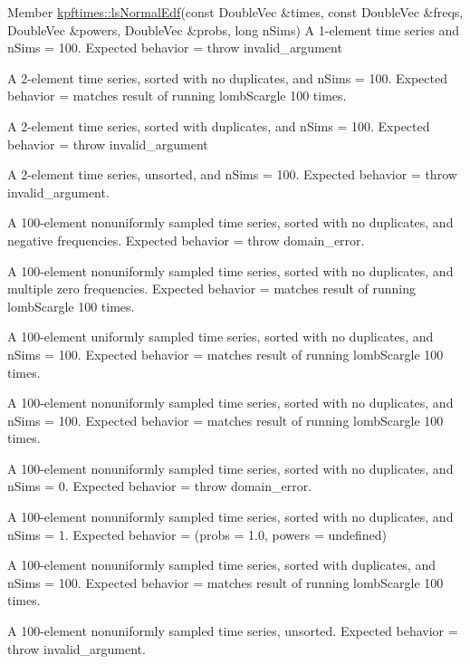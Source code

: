 \begin{DoxyDescription}
\item[Member \hyperlink{group__period_gab3a488d98ed28a6723689f09b5d984fb}{kpftimes::lsNormalEdf}(const DoubleVec \&times, const DoubleVec \&freqs, DoubleVec \&powers, DoubleVec \&probs, long nSims) ]A 1-\/element time series and nSims = 100. Expected behavior = throw invalid\_\-argument 

A 2-\/element time series, sorted with no duplicates, and nSims = 100. Expected behavior = matches result of running lombScargle 100 times. 

A 2-\/element time series, sorted with duplicates, and nSims = 100. Expected behavior = throw invalid\_\-argument 

A 2-\/element time series, unsorted, and nSims = 100. Expected behavior = throw invalid\_\-argument. 

A 100-\/element nonuniformly sampled time series, sorted with no duplicates, and negative frequencies. Expected behavior = throw domain\_\-error. 

A 100-\/element nonuniformly sampled time series, sorted with no duplicates, and multiple zero frequencies. Expected behavior = matches result of running lombScargle 100 times. 

A 100-\/element uniformly sampled time series, sorted with no duplicates, and nSims = 100. Expected behavior = matches result of running lombScargle 100 times. 

A 100-\/element nonuniformly sampled time series, sorted with no duplicates, and nSims = 100. Expected behavior = matches result of running lombScargle 100 times. 

A 100-\/element nonuniformly sampled time series, sorted with no duplicates, and nSims = 0. Expected behavior = throw domain\_\-error. 

A 100-\/element nonuniformly sampled time series, sorted with no duplicates, and nSims = 1. Expected behavior = (probs = 1.0, powers = undefined) 

A 100-\/element nonuniformly sampled time series, sorted with duplicates, and nSims = 100. Expected behavior = matches result of running lombScargle 100 times. 

A 100-\/element nonuniformly sampled time series, unsorted. Expected behavior = throw invalid\_\-argument. 
\end{DoxyDescription}

\label{test__test000004}
\hypertarget{test__test000004}{}
 
